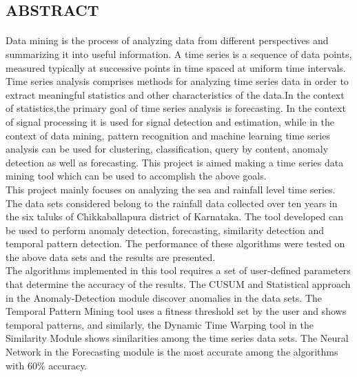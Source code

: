 \documentclass[12pt,a4paper]{report}
\begin{document}
\begin{center}
\section*{ABSTRACT}
\end{center} 

\paragraph{}  Data mining is the process of analyzing data from different perspectives and summarizing it into useful information. A time series is a sequence of data points, measured typically at successive points in time spaced at uniform time intervals. Time series analysis comprises methods for analyzing time series data in order to extract meaningful statistics and other characteristics of the data.In the context of statistics,the primary goal of time series analysis is forecasting. In the context of signal processing it is used for signal detection and estimation, while in the context of data mining, pattern recognition and machine learning time series analysis can be used for clustering, classification, query by content, anomaly detection as well as forecasting. This project is aimed making a time series data mining tool which can be used to accomplish the above goals. \\



This project mainly focuses on analyzing the sea and rainfall level time series. The data sets considered belong to the  rainfall data collected over ten years in the six taluks of Chikkaballapura district of Karnataka.
The tool developed can be used to perform anomaly detection, forecasting, similarity detection and temporal pattern detection. The performance of these algorithms were tested on the above data sets and the results are presented.  \\



The algorithms implemented in this tool requires a set of user-defined parameters that determine the accuracy of the results. The CUSUM and Statistical approach in the Anomaly-Detection module discover anomalies in the data sets. The Temporal Pattern Mining tool uses a fitness threshold set by the user and shows temporal patterns, and similarly, the Dynamic Time Warping tool in the Similarity Module shows similarities among the time series data sets. The Neural Network in the Forecasting module is the most accurate among the algorithms with 60\% accuracy. 
\end{document}
